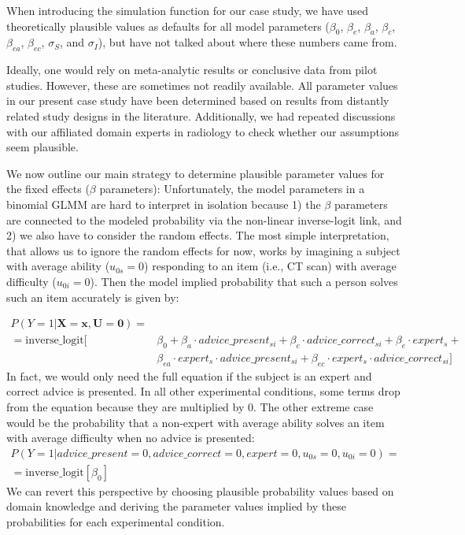\documentclass[
  man,floatsintext]{apa6}
\begin{document}
When introducing the simulation function for our case study, we have used theoretically plausible values as defaults for all model parameters (\(\beta_0\), \(\beta_e\), \(\beta_a\), \(\beta_c\), \(\beta_{ea}\), \(\beta_{ec}\), \(\sigma_S\), and \(\sigma_I\)), but have not talked about where these numbers came from.

Ideally, one would rely on meta-analytic results or conclusive data from pilot studies. However, these are sometimes not readily available. All parameter values in our present case study have been determined based on results from distantly related study designs in the literature. Additionally, we had repeated discussions with our affiliated domain experts in radiology to check whether our assumptions seem plausible.

We now outline our main strategy to determine plausible parameter values for the fixed effects (\(\beta\) parameters):
Unfortunately, the model parameters in a binomial GLMM are hard to interpret in isolation because 1) the \(\beta\) parameters are connected to the modeled probability via the non-linear inverse-logit link, and 2) we also have to consider the random effects.
The most simple interpretation, that allows us to ignore the random effects for now, works by imagining a subject with average ability (\(u_{0s} = 0\)) responding to an item (i.e., CT scan) with average difficulty (\(u_{0i} = 0\)).
Then the model implied probability that such a person solves such an item accurately is given by:

\[
\begin{aligned}
P(Y=1|\mathbf{X=x}, \mathbf{U} = \mathbf{0}) = \\
= \text{inverse\_logit}[&\beta_0 + \beta_a \cdot advice\_present_{si} + \beta_c \cdot advice\_correct_{si} + \beta_e \cdot expert_s + \\
&\beta_{ea} \cdot expert_{s} \cdot advice\_present_{si} + \beta_{ec} \cdot expert_{s} \cdot advice\_correct_{si}]
\end{aligned}
\]
In fact, we would only need the full equation if the subject is an expert and correct advice is presented.
In all other experimental conditions, some terms drop from the equation because they are multiplied by \(0\).
The other extreme case would be the probability that a non-expert with average ability solves an item with average difficulty when no advice is presented:
\[
\begin{aligned}
P(Y=1| advice\_present = 0, advice\_correct = 0, expert = 0, u_{0s} = 0, u_{0i} = 0) = \\
= \text{inverse\_logit}[\beta_0]
\end{aligned}
\]
We can revert this perspective by choosing plausible probability values based on domain knowledge and deriving the parameter values implied by these probabilities for each experimental condition.
\end{document}
